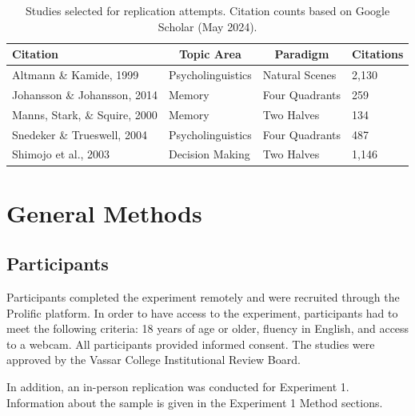 \documentclass[
  man,floatsintext]{apa6}
\begin{document}
\begin{table}[tbp]

\begin{center}
\begin{threeparttable}

\caption{\label{tab:studies-table}Studies selected for replication attempts. Citation counts based on Google Scholar (May 2024).}

\small{

\begin{tabular}{llll}
\toprule
Citation & \multicolumn{1}{c}{Topic Area} & \multicolumn{1}{c}{Paradigm} & \multicolumn{1}{c}{Citations}\\
\midrule
Altmann \& Kamide, 1999 & Psycholinguistics & Natural Scenes & 2,130\\
Johansson \& Johansson, 2014 & Memory & Four Quadrants & 259\\
Manns, Stark, \& Squire, 2000 & Memory & Two Halves & 134\\
Snedeker \& Trueswell, 2004 & Psycholinguistics & Four Quadrants & 487\\
Shimojo et al., 2003 & Decision Making & Two Halves & 1,146\\
\bottomrule
\end{tabular}

}

\end{threeparttable}
\end{center}

\end{table}

\section{General Methods}\label{general-methods}

\subsection{Participants}\label{participants}

Participants completed the experiment remotely and were recruited
through the Prolific platform. In order to have access to the
experiment, participants had to meet the following criteria: 18 years of
age or older, fluency in English, and access to a webcam. All
participants provided informed consent. The studies were approved by the
Vassar College Institutional Review Board.

In addition, an in-person replication was conducted for Experiment 1.
Information about the sample is given in the Experiment 1 Method sections.
\end{document}
